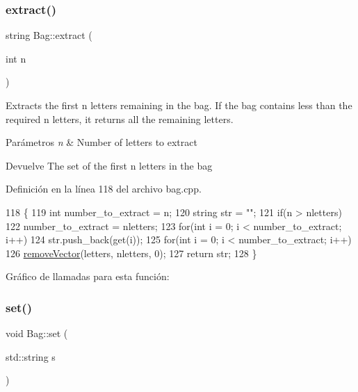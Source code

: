 \subsubsection{\texorpdfstring{extract()}{extract()}}
{\footnotesize\ttfamily string Bag\+::extract (\begin{DoxyParamCaption}\item[{int}]{n }\end{DoxyParamCaption})}



Extracts the first {\ttfamily n} letters remaining in the bag. If the bag contains less than the required {\ttfamily n} letters, it returns all the remaining letters. 


\begin{DoxyParams}{Parámetros}
{\em n} & Number of letters to extract \\
\hline
\end{DoxyParams}
\begin{DoxyReturn}{Devuelve}
The set of the first {\ttfamily n} letters in the bag 
\end{DoxyReturn}


Definición en la línea 118 del archivo bag.\+cpp.


\begin{DoxyCode}
118                         \{
119     \textcolor{keywordtype}{int} number\_to\_extract = n;
120     \textcolor{keywordtype}{string} str = \textcolor{stringliteral}{""};
121     \textcolor{keywordflow}{if}(n > nletters)
122         number\_to\_extract = nletters;
123     \textcolor{keywordflow}{for}(\textcolor{keywordtype}{int} i = 0; i < number\_to\_extract; i++)
124         str.push\_back(\textcolor{keyword}{get}(i));
125     \textcolor{keywordflow}{for}(\textcolor{keywordtype}{int} i = 0; i < number\_to\_extract; i++)
126         \hyperlink{bag_8cpp_a8ccee2a743b58f469047c4b4406a71e2}{removeVector}(letters, nletters, 0);
127     \textcolor{keywordflow}{return} str;
128 \}
\end{DoxyCode}
Gráfico de llamadas para esta función\+:
\mbox{\label{classBag_a3de5aa1629a7fdd40630d140adde2757}} 
\subsubsection{\texorpdfstring{set()}{set()}}
{\footnotesize\ttfamily void Bag\+::set (\begin{DoxyParamCaption}\item[{std\+::string}]{s }\end{DoxyParamCaption})}



